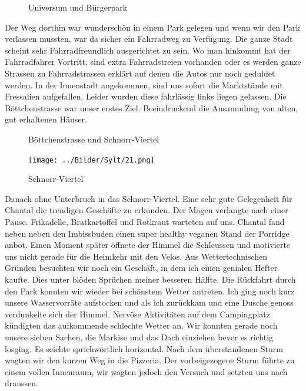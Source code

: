 \begin{figure}[H]
   \centering
   \quad
   \quad
   \caption[Universum und Bürgerpark]{Universum und Bürgerpark}
\end{figure}

Der Weg dorthin war wunderschön in einem Park gelegen und wenn wir den Park verlassen mussten, war da sicher ein Fahrradweg zu Verfügung.
Die ganze Stadt scheint sehr Fahrradfreundlich ausgerichtet zu sein.
Wo man hinkommt hat der Fahrradfahrer Vortritt, sind extra Fahrradstreien vorhanden oder es werden ganze Strassen zu Fahrradstrassen erklärt auf denen die Autos nur noch geduldet werden.
In der Innenstadt angekommen, sind uns sofort die Marktstände mit Fressalien aufgefallen. Leider wurden diese fahrlässig links liegen gelassen.
Die Böttchenstrasse war unser erstes Ziel. Beeindruckend die Ansammlung von alten, gut erhaltenen Häuser.

\begin{figure}[t]
   \centering
   \quad
   \quad
   \quad
   \caption[Böttchenstrasse und Schnorr-Viertel]{Böttchenstrasse und Schnorr-Viertel}
\end{figure}


\begin{figure} 
  \begin{centering}
    \texttt{[image: ../Bilder/Sylt/21.png]}
    \caption{Schnorr-Viertel}
  \end{centering}
\end{figure} 

Danach ohne Unterbruch in das Schnorr-Viertel.
Eine sehr gute Gelegenheit für Chantal die trendigen Geschäfte zu erkunden.
Der Magen verlangte nach einer Pause. 
Frikadelle, Bratkartoffel und Rotkraut warteten auf uns.
Chantal fand neben neben den Imbissbuden einen super healthy veganen Stand der Porridge anbot.
Einen Moment später öffnete der Himmel die Schleussen und motivierte uns nicht gerade für die Heimkehr mit den Velos.
Aus Wettertechnischen Gründen besuchten wir noch ein Geschäft, in dem ich einen genialen Hefter kaufte. 
Dies unter blöden Sprüchen meiner besseren Hälfte.
Die Rückfahrt durch den Park konnten wir wieder bei schönstem Wetter antreten.
Ich ging noch kurz unsere Wasservorräte aufstocken und als ich zurückkam und eine Dusche genoss verdunkelte sich der Himmel.
Nervöse Aktivitäten auf dem Campingplatz kündigten das aufkommende schlechte Wetter an.
Wir konnten gerade noch unsere sieben Sachen, die Markise und das Dach einziehen bevor es richtig losging.
Es seichte sprichwörtlich horizontal.
Nach dem überstandenen Sturm wagten wir den kurzen Weg in die Pizzeria.
Der vorbeigezogene Sturm führte zu einem vollen Innenraum, wir wagten jedoch den Versuch und setzten uns nach draussen.
\newpage
